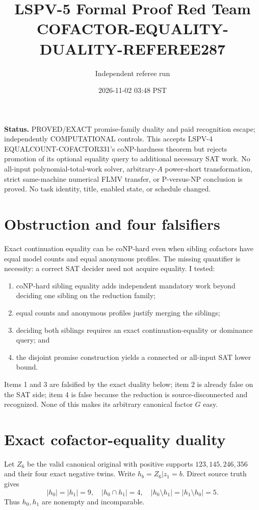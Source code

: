 \documentclass[11pt]{article}
\title{LSPV-5 Formal Proof Red Team\\COFACTOR-EQUALITY-DUALITY-REFEREE287}
\author{Independent referee run}
\date{2026-11-02 03:48 PST}
\begin{document}
\maketitle

\noindent\textbf{Status.} PROVED/EXACT promise-family duality and paid recognition escape; independently COMPUTATIONAL controls. This accepts LSPV-4 EQUALCOUNT-COFACTOR331's coNP-hardness theorem but rejects promotion of its optional equality query to additional necessary SAT work. No all-input polynomial-total-work solver, arbitrary-$A$ power-short transformation, strict same-machine numerical FLMV transfer, or P-versus-NP conclusion is proved. No task identity, title, enabled state, or schedule changed.

\section{Obstruction and four falsifiers}
Exact continuation equality can be coNP-hard even when sibling cofactors have equal model counts and equal anonymous profiles. The missing quantifier is necessity: a correct SAT decider need not acquire equality. I tested:
\begin{enumerate}
\item coNP-hard sibling equality adds independent mandatory work beyond deciding one sibling on the reduction family;
\item equal counts and anonymous profiles justify merging the siblings;
\item deciding both siblings requires an exact continuation-equality or dominance query; and
\item the disjoint promise construction yields a connected or all-input SAT lower bound.
\end{enumerate}
Items 1 and 3 are falsified by the exact duality below; item 2 is already false on the SAT side; item 4 is false because the reduction is source-disconnected and recognized. None of this makes its arbitrary canonical factor $G$ easy.

\section{Exact cofactor-equality duality}
Let $Z_6$ be the valid canonical original with positive supports $123,145,246,356$ and their four exact negative twins. Write $h_b=Z_6|z_1=b$. Direct source truth gives
\[
|h_0|=|h_1|=9,\quad |h_0\cap h_1|=4,
\quad |h_0\setminus h_1|=|h_1\setminus h_0|=5.
\]
Thus $h_0,h_1$ are nonempty and incomparable.
\end{document}
